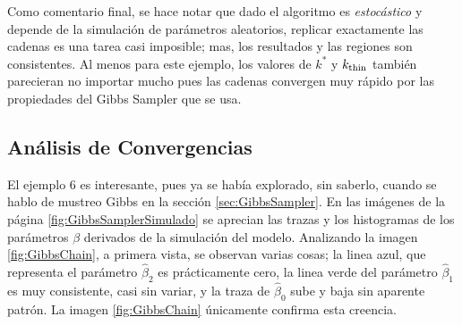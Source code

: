 \documentclass[../Main/Main.tex]{subfiles}
\begin{document}
Como comentario final, se hace notar que dado el algoritmo es \textit{estocástico} y depende de la simulación de parámetros aleatorios, replicar exactamente las cadenas es una tarea casi imposible; mas, los resultados y las regiones son consistentes. Al menos para este ejemplo, los valores de $k^*$ y $k_{\text{thin}}$ también parecieran no importar mucho pues las cadenas convergen muy rápido por las propiedades del Gibbs Sampler que se usa. 

\subsection{Análisis de Convergencias} \label{sec:AnalisisConv}
El ejemplo 6 es interesante, pues ya se había explorado, sin saberlo, cuando se hablo de mustreo Gibbs en la sección \ref{sec:GibbsSampler}. En las imágenes de la página \ref{fig:GibbsSamplerSimulado} se aprecian las trazas y los histogramas de los parámetros $\beta$ derivados de la simulación del modelo. Analizando la imagen \ref{fig:GibbsChain}, a primera vista, se observan varias cosas; la linea azul, que representa el parámetro $\hat{\beta}_2$ es prácticamente cero, la linea verde del parámetro $\hat{\beta}_1$ es muy consistente, casi sin variar, y la traza de $\hat{\beta}_0$ sube y baja sin aparente patrón. La imagen \ref{fig:GibbsChain} únicamente confirma esta creencia.\\
\end{document}
